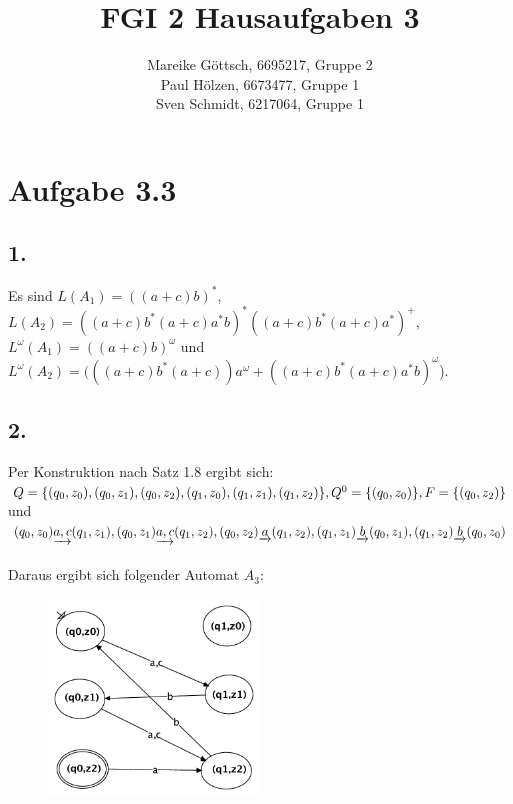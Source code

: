 \documentclass[12pt, paper=a4]{article}
\author{Mareike Göttsch, 6695217, Gruppe 2\\Paul Hölzen, 6673477, Gruppe 1\\Sven Schmidt, 6217064, Gruppe 1}
\title{FGI 2 Hausaufgaben 3}
\begin{document}
\maketitle

\section*{Aufgabe 3.3}

\subsection*{1.}
Es sind \(L(A_1)=((a+c)b)^*\),\\ \(L(A_2)=((a+c)b^*(a+c)a^*b)^*((a+c)b^*(a+c)a^*)^+\),\\ 
	\(L^\omega(A_1)=((a+c)b)^\omega\) und \\
	\(L^\omega(A_2)=(((a+c)b^*(a+c))a^\omega+((a+c)b^*(a+c)a^*b)^\omega\)).\\
	
\subsection*{2.}	
	Per Konstruktion nach Satz 1.8 ergibt sich:\\
	\(Q=\{(q_0,z_0),(q_0,z_1),(q_0,z_2),(q_1,z_0),(q_1,z_1),(q_1,z_2)\}, Q^0=\{(q_0,z_0)\}, \\
	F=\{(q_0,z_2)\} \) und 
	\((q_0,z_0)\underrightarrow{a,c}(q_1,z_1), (q_0,z_1)\underrightarrow{a,c}(q_1,z_2), (q_0,z_2)\underrightarrow{a}(q_1,z_2),\\
	(q_1,z_1)\underrightarrow{b}(q_0,z_1), (q_1,z_2)\underrightarrow{b}(q_0,z_0)\) \\ 
	\\
	Daraus ergibt sich folgender Automat \(A_3\): \\
	\begin {figure}[h]
  		\centering \includegraphics[width=0.5\textwidth]{A3}
	\end {figure}
	
\end{document}
